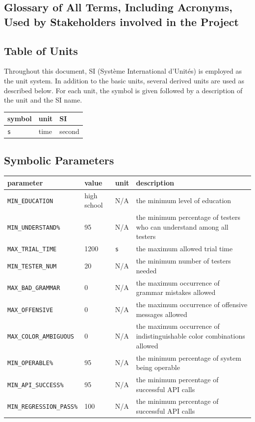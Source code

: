 \documentclass[12pt]{article}
\begin{document}
\subsection{Glossary of All Terms, Including Acronyms, Used by Stakeholders
involved in the Project}
\subsection{Table of Units}

Throughout this document, SI (Syst\`{e}me International d'Unit\'{e}s) is employed
as the unit system.  In addition to the basic units, several derived units are
used as described below.  For each unit, the symbol is given followed by a
description of the unit and the SI name.

\begin{tabular}{ |l|l|l|  }

\hline
symbol & unit & SI \\
\hline
\texttt{s} & time & second\\
\hline
\end{tabular}

\subsection{Symbolic Parameters}

\begin{tabular}{|l|l|l|p{5cm}|}

\hline
parameter & value & unit & description\\
\hline
\texttt{MIN\_EDUCATION} & high school & N/A & the minimum level of education\\
\hline
\texttt{MIN\_UNDERSTAND\%} & 95 & N/A & the minimum percentage of testers who can understand among all testers\\
\hline
\texttt{MAX\_TRIAL\_TIME} & 1200 & \texttt{s} & the maximum allowed trial time\\
\hline
\texttt{MIN\_TESTER\_NUM} &  20& N/A & the minimum number of testers needed\\
\hline
\texttt{MAX\_BAD\_GRAMMAR} & 0& N/A & the maximum occurrence of grammar mistakes allowed \\
\hline
\texttt{MAX\_OFFENSIVE} & 0& N/A & the maximum occurrence of offensive messages allowed\\
\hline
\texttt{MAX\_COLOR\_AMBIGUOUS} & 0& N/A & the maximum occurrence of indistinguishable color combinations allowed\\
\hline
\texttt{MIN\_OPERABLE\%} & 95 & N/A & the minimum percentage of system being operable \\
\hline
\texttt{MIN\_API\_SUCCESS\%} & 95 & N/A &  the minimum percentage of successful API calls\\
\hline
\texttt{MIN\_REGRESSION\_PASS\%} & 100  & N/A &  the minimum percentage of successful API calls\\
\hline
\end{tabular}
\end{document}
